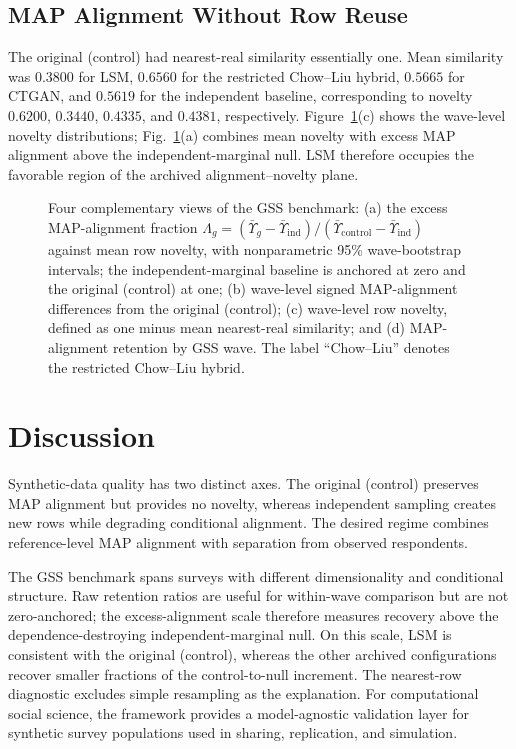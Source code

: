 \documentclass[runningheads]{llncs}
\begin{document}
\subsection{MAP Alignment Without Row Reuse}

The original (control) had nearest-real similarity essentially one. Mean
similarity was $0.3800$ for LSM, $0.6560$ for the restricted Chow--Liu hybrid,
$0.5665$ for CTGAN, and $0.5619$ for the independent baseline, corresponding to
novelty $0.6200$, $0.3440$, $0.4335$, and $0.4381$, respectively.
Figure~\ref{fig:gss_benchmark_four_panel}(c) shows the wave-level novelty
distributions; Fig.~\ref{fig:gss_benchmark_four_panel}(a) combines mean novelty
with excess MAP alignment above the independent-marginal null. LSM therefore
occupies the favorable region of the archived alignment--novelty plane.


\begin{figure}[tbp]
  \centering
  
\caption{Four complementary views of the GSS benchmark: (a) the excess
MAP-alignment fraction
$\Lambda_g=(\bar{\Upsilon}_g-\bar{\Upsilon}_{\mathrm{ind}})/
(\bar{\Upsilon}_{\mathrm{control}}-\bar{\Upsilon}_{\mathrm{ind}})$
against mean row novelty, with nonparametric 95\% wave-bootstrap intervals; the
independent-marginal baseline is anchored at zero and the original (control)
at one; (b) wave-level signed MAP-alignment differences from the original (control);
(c) wave-level row novelty, defined as one minus mean nearest-real
similarity; and (d) MAP-alignment retention by GSS wave. The label
``Chow--Liu'' denotes the restricted Chow--Liu hybrid.}
\label{fig:gss_benchmark_four_panel}
\end{figure}


\section{Discussion}

Synthetic-data quality has two distinct axes. The original (control) preserves
MAP alignment but provides no novelty, whereas independent sampling creates new
rows while degrading conditional alignment. The desired regime combines
reference-level MAP alignment with separation from observed respondents.

The GSS benchmark spans surveys with different dimensionality and conditional
structure. Raw retention ratios are useful for within-wave comparison but are
not zero-anchored; the excess-alignment scale therefore measures recovery above
the dependence-destroying independent-marginal null. On this scale, LSM is
consistent with the original (control), whereas the other archived
configurations recover smaller fractions of the control-to-null increment. The
nearest-row diagnostic excludes simple resampling as the explanation. For
computational social science, the framework provides a model-agnostic validation
layer for synthetic survey populations used in sharing, replication, and
simulation.
\end{document}

